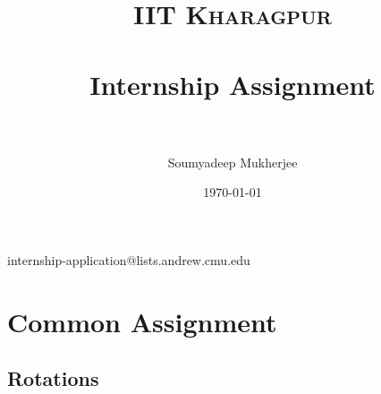 \documentclass[paper=a4, fontsize=11pt]{scrartcl} %
\title{	
\normalfont \normalsize 
\textsc{IIT Kharagpur} \\ [25pt] %
\horrule{0.5pt} \\[0.4cm] %
\huge Internship Assignment \\ %
\horrule{2pt} \\[0.5cm] %
}
\author{Soumyadeep Mukherjee} %
\date{\normalsize\today} %
\numberwithin{equation}{section} %
\numberwithin{figure}{section} %
\numberwithin{table}{section} %
\begin{document}
\maketitle %

internship-application@lists.andrew.cmu.edu
\section{Common Assignment}


\subsection{Rotations}
\end{document}
